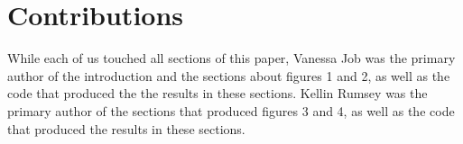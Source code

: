 \documentclass[conference]{IEEEtran}
\begin{document}
\section{Contributions}

While each of us touched all sections of this paper, Vanessa Job was the primary author of the introduction and the sections about figures 1 and 2, as well as the code that produced the the results in these sections.   Kellin Rumsey was the primary author of the sections that produced figures 3 and 4, as well as the code that produced the results in these sections.  



\end{document}
